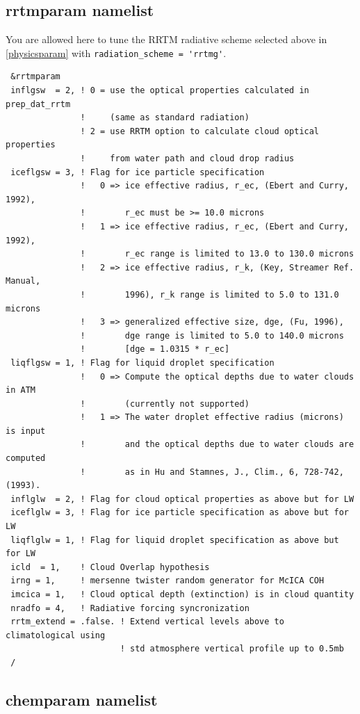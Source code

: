\subsection{rrtmparam namelist}

You are allowed here to tune the RRTM radiative scheme selected above in
\ref{physicsparam} with \verb|radiation_scheme = 'rrtmg'|.

{\footnotesize
\begin{Verbatim}
 &rrtmparam
 inflgsw  = 2, ! 0 = use the optical properties calculated in prep_dat_rrtm
               !     (same as standard radiation)
               ! 2 = use RRTM option to calculate cloud optical properties
               !     from water path and cloud drop radius
 iceflgsw = 3, ! Flag for ice particle specification
               !   0 => ice effective radius, r_ec, (Ebert and Curry, 1992),
               !        r_ec must be >= 10.0 microns
               !   1 => ice effective radius, r_ec, (Ebert and Curry, 1992),
               !        r_ec range is limited to 13.0 to 130.0 microns
               !   2 => ice effective radius, r_k, (Key, Streamer Ref. Manual,
               !        1996), r_k range is limited to 5.0 to 131.0 microns
               !   3 => generalized effective size, dge, (Fu, 1996),
               !        dge range is limited to 5.0 to 140.0 microns
               !        [dge = 1.0315 * r_ec]
 liqflgsw = 1, ! Flag for liquid droplet specification
               !   0 => Compute the optical depths due to water clouds in ATM
               !        (currently not supported)
               !   1 => The water droplet effective radius (microns) is input
               !        and the optical depths due to water clouds are computed
               !        as in Hu and Stamnes, J., Clim., 6, 728-742, (1993).
 inflglw  = 2, ! Flag for cloud optical properties as above but for LW
 iceflglw = 3, ! Flag for ice particle specification as above but for LW
 liqflglw = 1, ! Flag for liquid droplet specification as above but for LW
 icld  = 1,    ! Cloud Overlap hypothesis
 irng = 1,     ! mersenne twister random generator for McICA COH
 imcica = 1,   ! Cloud optical depth (extinction) is in cloud quantity
 nradfo = 4,   ! Radiative forcing syncronization
 rrtm_extend = .false. ! Extend vertical levels above to climatological using
                       ! std atmosphere vertical profile up to 0.5mb
 /
\end{Verbatim}
}

\subsection{chemparam namelist}
\label{chemparam}

